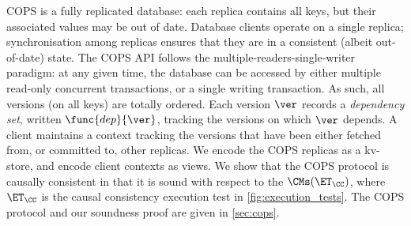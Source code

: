 COPS is a fully replicated database: each replica contains all keys, but their associated values may be out of date.
Database clients operate on a single replica; 
synchronisation among replicas ensures that they are in a consistent (albeit out-of-date) state.
The COPS API follows the multiple-readers-single-writer paradigm: 
at any given time, the database can be accessed by either multiple read-only concurrent transactions, or a single writing transaction. 
As such, all versions (on all keys) are totally ordered. 
Each version $\ver$ records a \emph{dependency set}, written $\func{dep}{\ver}$,
tracking the versions on which $\ver$ depends.
A client maintains a context tracking the versions that have been either fetched from, or committed to, other replicas.
%
%
%
%
We encode the COPS replicas as a kv-store, and encode client contexts as views.  
We show that the COPS protocol is causally consistent in that it is sound with respect to the $\CMs(\ET_\CC)$,
where $\ET_\CC$ is the causal consistency execution test in \cref{fig:execution_tests}.
The COPS protocol and our soundness proof are given in \cref{sec:cops}.

